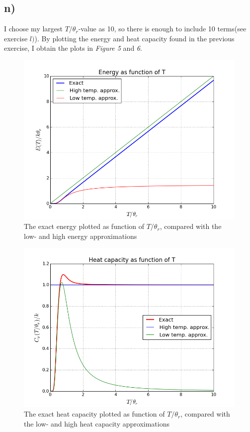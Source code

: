 \documentclass{scrartcl}
\begin{document}
\subsection*{n)}
I choose my largest $T/\theta_r$-value as 10, so there is enough to include 10 terms(see exercise $l)$). By plotting the energy and heat capacity found in the previous exercise, I obtain the plots in \textit{Figure 5} and \textit{6}.
\begin{figure}[H]
\centering
\includegraphics[width=120mm]{oblig2_5.png}
\caption{The exact energy plotted as function of $T/\theta_r$, compared with the low- and high energy approximations \label{overflow}}
\end{figure}
\begin{figure}[H]
\centering
\includegraphics[width=120mm]{oblig2_6.png}
\caption{The exact heat capacity plotted as function of $T/\theta_r$, compared with the low- and high heat capacity approximations \label{overflow}}
\end{figure}
\end{document}
